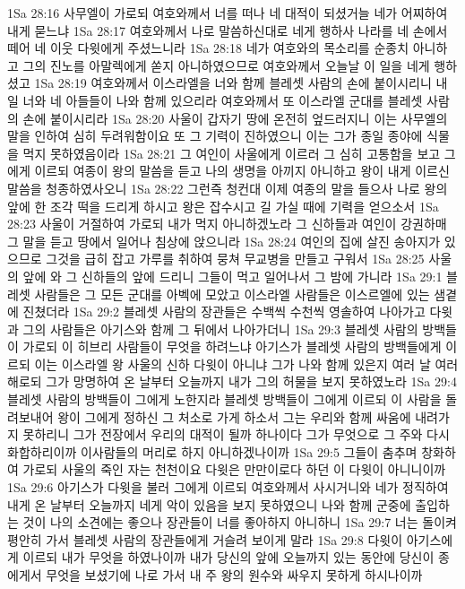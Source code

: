 1Sa 28:16  사무엘이 가로되 여호와께서 너를 떠나 네 대적이 되셨거늘 네가 어찌하여 내게 묻느냐
1Sa 28:17  여호와께서 나로 말씀하신대로 네게 행하사 나라를 네 손에서 떼어 네 이웃 다윗에게 주셨느니라
1Sa 28:18  네가 여호와의 목소리를 순종치 아니하고 그의 진노를 아말렉에게 쏟지 아니하였으므로 여호와께서 오늘날 이 일을 네게 행하셨고
1Sa 28:19  여호와께서 이스라엘을 너와 함께 블레셋 사람의 손에 붙이시리니 내일 너와 네 아들들이 나와 함께 있으리라 여호와께서 또 이스라엘 군대를 블레셋 사람의 손에 붙이시리라
1Sa 28:20  사울이 갑자기 땅에 온전히 엎드러지니 이는 사무엘의 말을 인하여 심히 두려워함이요 또 그 기력이 진하였으니 이는 그가 종일 종야에 식물을 먹지 못하였음이라
1Sa 28:21  그 여인이 사울에게 이르러 그 심히 고통함을 보고 그에게 이르되 여종이 왕의 말씀을 듣고 나의 생명을 아끼지 아니하고 왕이 내게 이르신 말씀을 청종하였사오니
1Sa 28:22  그런즉 청컨대 이제 여종의 말을 들으사 나로 왕의 앞에 한 조각 떡을 드리게 하시고 왕은 잡수시고 길 가실 때에 기력을 얻으소서
1Sa 28:23  사울이 거절하여 가로되 내가 먹지 아니하겠노라 그 신하들과 여인이 강권하매 그 말을 듣고 땅에서 일어나 침상에 앉으니라
1Sa 28:24  여인의 집에 살진 송아지가 있으므로 그것을 급히 잡고 가루를 취하여 뭉쳐 무교병을 만들고 구워서
1Sa 28:25  사울의 앞에 와 그 신하들의 앞에 드리니 그들이 먹고 일어나서 그 밤에 가니라
1Sa 29:1  블레셋 사람들은 그 모든 군대를 아벡에 모았고 이스라엘 사람들은 이스르엘에 있는 샘곁에 진쳤더라
1Sa 29:2  블레셋 사람의 장관들은 수백씩 수천씩 영솔하여 나아가고 다윗과 그의 사람들은 아기스와 함께 그 뒤에서 나아가더니
1Sa 29:3  블레셋 사람의 방백들이 가로되 이 히브리 사람들이 무엇을 하려느냐 아기스가 블레셋 사람의 방백들에게 이르되 이는 이스라엘 왕 사울의 신하 다윗이 아니냐 그가 나와 함께 있은지 여러 날 여러 해로되 그가 망명하여 온 날부터 오늘까지 내가 그의 허물을 보지 못하였노라
1Sa 29:4  블레셋 사람의 방백들이 그에게 노한지라 블레셋 방백들이 그에게 이르되 이 사람을 돌려보내어 왕이 그에게 정하신 그 처소로 가게 하소서 그는 우리와 함께 싸움에 내려가지 못하리니 그가 전장에서 우리의 대적이 될까 하나이다 그가 무엇으로 그 주와 다시 화합하리이까 이사람들의 머리로 하지 아니하겠나이까
1Sa 29:5  그들이 춤추며 창화하여 가로되 사울의 죽인 자는 천천이요 다윗은 만만이로다 하던 이 다윗이 아니니이까
1Sa 29:6  아기스가 다윗을 불러 그에게 이르되 여호와께서 사시거니와 네가 정직하여 내게 온 날부터 오늘까지 네게 악이 있음을 보지 못하였으니 나와 함께 군중에 출입하는 것이 나의 소견에는 좋으나 장관들이 너를 좋아하지 아니하니
1Sa 29:7  너는 돌이켜 평안히 가서 블레셋 사람의 장관들에게 거슬려 보이게 말라
1Sa 29:8  다윗이 아기스에게 이르되 내가 무엇을 하였나이까 내가 당신의 앞에 오늘까지 있는 동안에 당신이 종에게서 무엇을 보셨기에 나로 가서 내 주 왕의 원수와 싸우지 못하게 하시나이까
